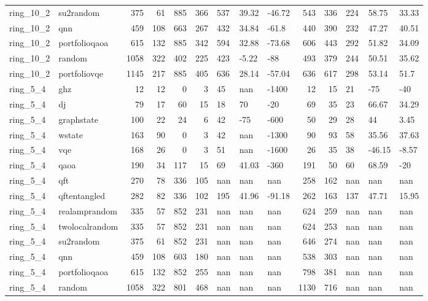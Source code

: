 \begin{longtable}{llrrrrlllrrlll}
ring\_10\_2 & su2random & 375 & 61 & 885 & 366 & 537 & 39.32 & -46.72 & 543 & 336 & 224 & 58.75 & 33.33 \\
ring\_10\_2 & qnn & 459 & 108 & 663 & 267 & 432 & 34.84 & -61.8 & 440 & 390 & 232 & 47.27 & 40.51 \\
ring\_10\_2 & portfolioqaoa & 615 & 132 & 885 & 342 & 594 & 32.88 & -73.68 & 606 & 443 & 292 & 51.82 & 34.09 \\
ring\_10\_2 & random & 1058 & 322 & 402 & 225 & 423 & -5.22 & -88 & 493 & 379 & 244 & 50.51 & 35.62 \\
ring\_10\_2 & portfoliovqe & 1145 & 217 & 885 & 405 & 636 & 28.14 & -57.04 & 636 & 617 & 298 & 53.14 & 51.7 \\
ring\_5\_4 & ghz & 12 & 12 & 0 & 3 & 45 & nan & -1400 & 12 & 15 & 21 & -75 & -40 \\
ring\_5\_4 & dj & 79 & 17 & 60 & 15 & 18 & 70 & -20 & 69 & 35 & 23 & 66.67 & 34.29 \\
ring\_5\_4 & graphstate & 100 & 22 & 24 & 6 & 42 & -75 & -600 & 50 & 29 & 28 & 44 & 3.45 \\
ring\_5\_4 & wstate & 163 & 90 & 0 & 3 & 42 & nan & -1300 & 90 & 93 & 58 & 35.56 & 37.63 \\
ring\_5\_4 & vqe & 168 & 26 & 0 & 3 & 51 & nan & -1600 & 26 & 35 & 38 & -46.15 & -8.57 \\
ring\_5\_4 & qaoa & 190 & 34 & 117 & 15 & 69 & 41.03 & -360 & 191 & 50 & 60 & 68.59 & -20 \\
ring\_5\_4 & qft & 270 & 78 & 336 & 105 & nan & nan & nan & 258 & 162 & nan & nan & nan \\
ring\_5\_4 & qftentangled & 282 & 82 & 336 & 102 & 195 & 41.96 & -91.18 & 262 & 163 & 137 & 47.71 & 15.95 \\
ring\_5\_4 & realamprandom & 335 & 57 & 852 & 231 & nan & nan & nan & 624 & 259 & nan & nan & nan \\
ring\_5\_4 & twolocalrandom & 335 & 57 & 852 & 231 & nan & nan & nan & 624 & 253 & nan & nan & nan \\
ring\_5\_4 & su2random & 375 & 61 & 852 & 231 & nan & nan & nan & 646 & 274 & nan & nan & nan \\
ring\_5\_4 & qnn & 459 & 108 & 603 & 180 & nan & nan & nan & 538 & 303 & nan & nan & nan \\
ring\_5\_4 & portfolioqaoa & 615 & 132 & 852 & 255 & nan & nan & nan & 798 & 381 & nan & nan & nan \\
ring\_5\_4 & random & 1058 & 322 & 801 & 468 & nan & nan & nan & 1130 & 716 & nan & nan & nan \\

\end{longtable}
